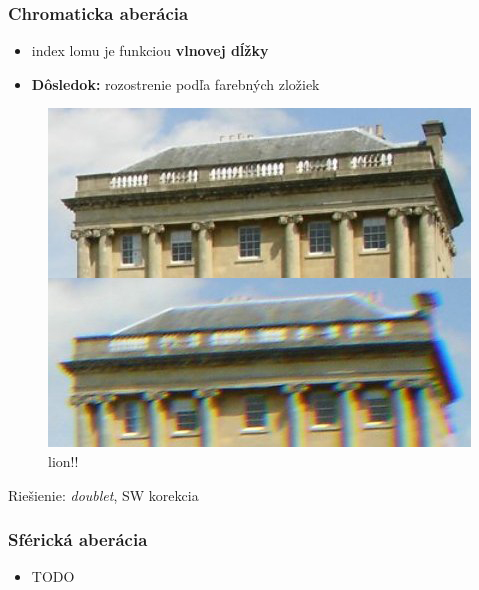 \documentclass[10pt,xcolor=pdflatex]{beamer}
\begin{document}
\begin{frame}\frametitle{Chromaticka aberácia}
    \begin{itemize}
        \item index lomu je funkciou \textbf{vlnovej dĺžky}
        \item \textbf{Dôsledok:} rozostrenie podľa farebných zložiek
    \end{itemize}

    \begin{figure}
        \includegraphics[scale=0.4]{img/chromaticAberrationWikipedia.jpg}
        \caption{lion!!}
    \end{figure}
    Riešienie: \textit{doublet}, SW korekcia 
\end{frame}

\begin{frame}\frametitle{Sférická aberácia}
    \begin{itemize}
        \item TODO
    \end{itemize}
\end{frame}

\end{document}
